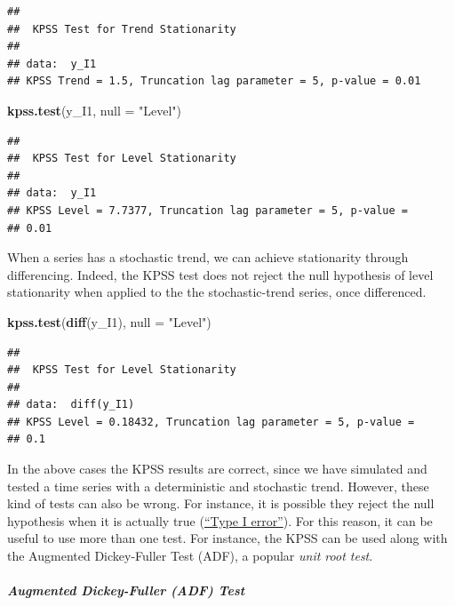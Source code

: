 \documentclass[
]{article}
\newenvironment{Shaded}{\begin{snugshade}}{\end{snugshade}}
\newcommand{\DataTypeTok}[1]{\textcolor[rgb]{0.13,0.29,0.53}{#1}}
\newcommand{\KeywordTok}[1]{\textcolor[rgb]{0.13,0.29,0.53}{\textbf{#1}}}
\newcommand{\NormalTok}[1]{#1}
\newcommand{\StringTok}[1]{\textcolor[rgb]{0.31,0.60,0.02}{#1}}
\begin{document}
\begin{verbatim}
## 
##  KPSS Test for Trend Stationarity
## 
## data:  y_I1
## KPSS Trend = 1.5, Truncation lag parameter = 5, p-value = 0.01
\end{verbatim}

\begin{Shaded}
\begin{Highlighting}[]
\KeywordTok{kpss.test}\NormalTok{(y_I1, }\DataTypeTok{null =} \StringTok{"Level"}\NormalTok{)}
\end{Highlighting}
\end{Shaded}

\begin{verbatim}
## 
##  KPSS Test for Level Stationarity
## 
## data:  y_I1
## KPSS Level = 7.7377, Truncation lag parameter = 5, p-value =
## 0.01
\end{verbatim}

When a series has a stochastic trend, we can achieve stationarity through differencing. Indeed, the KPSS test does not reject the null hypothesis of level stationarity when applied to the the stochastic-trend series, once differenced.

\begin{Shaded}
\begin{Highlighting}[]
\KeywordTok{kpss.test}\NormalTok{(}\KeywordTok{diff}\NormalTok{(y_I1), }\DataTypeTok{null =} \StringTok{"Level"}\NormalTok{)}
\end{Highlighting}
\end{Shaded}

\begin{verbatim}
## 
##  KPSS Test for Level Stationarity
## 
## data:  diff(y_I1)
## KPSS Level = 0.18432, Truncation lag parameter = 5, p-value =
## 0.1
\end{verbatim}

In the above cases the KPSS results are correct, since we have simulated and tested a time series with a deterministic and stochastic trend. However, these kind of tests can also be wrong. For instance, it is possible they reject the null hypothesis when it is actually true (\href{https://en.wikipedia.org/wiki/Type_I_and_type_II_errors}{``Type I error''}). For this reason, it can be useful to use more than one test. For instance, the KPSS can be used along with the Augmented Dickey-Fuller Test (ADF), a popular \emph{unit root test}.

\hypertarget{augmented-dickey-fuller-adf-test}{%
\subparagraph{Augmented Dickey-Fuller (ADF) Test}\label{augmented-dickey-fuller-adf-test}}
\end{document}
